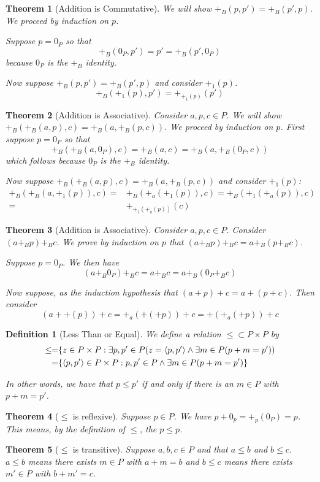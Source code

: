 \documentclass[12pt]{article}
\theoremstyle{break}
\newtheorem{definition}{Definition}[section]
\theoremstyle{break}
\newtheorem{theorem}{Theorem}[section]
\theoremstyle{break}
\theoremstyle{break}
\theoremstyle{break}
\newtheorem{informal definition}[definition]{Informal Definition}
\begin{document}
\begin{theorem}[Addition is Commutative]
We will show $+_B(p, p') = +_B(p', p)$.
We proceed by induction on $p$.

Suppose $p=0_P$ so that
$$
+_B(0_P, p') = p' = +_B(p', 0_P)
$$
because $0_P$ is the $+_B$ identity.

Now suppose $+_B(p, p') = +_B(p', p)$ and consider $+_1(p)$.
$$
+_B(+_1(p), p') = +_{+_1(p)}(p')
$$

\end{theorem}

\begin{theorem}[Addition is Associative]
Consider $a, p, c \in P$.
We will show $+_B(+_B(a, p), c) = +_B(a, +_B(p, c))$.
We proceed by induction on $p$.
First suppose $p=0_P$ so that
$$
+_B(+_B(a, 0_P), c) = +_B(a, c) = +_B(a, +_B(0_P, c))
$$
which follows because $0_P$ is the $+_B$ identity.

Now suppose $+_B(+_B(a, p), c) = +_B(a, +_B(p, c))$ and consider $+_1(p)$:
\begin{align*}
+_B(+_B(a, +_1(p)), c) =& +_B(+_a(+_1(p)), c) = +_B(+_1(+_a(p)), c)\\
=& +_{+_1(+_a(p))}(c)
\end{align*}
\end{theorem}


\begin{theorem}[Addition is Associative]
Consider $a, p, c\in P$.
Consider $(a+_B p) +_B c$.
We prove by induction on $p$ that $(a +_B p) +_B c = a +_B (p+_B c)$.

Suppose $p=0_P$.
We then have
$$
(a+_B 0_P) +_B c = a +_B c = a +_B (0_P +_B c)
$$

Now suppose, as the induction hypothesis that $(a + p) + c = a + (p+c)$.
Then consider
$$
(a + +(p)) + c = +_a(+(+p)) + c = +(+_a(+p)) + c
$$

\end{theorem}

\begin{definition}[Less Than or Equal]
We define a relation $\le\subset P \times P$ by
\begin{align*}
\le =& \{z \in P\times P: \exists p, p' \in P (z = \braket{p, p'} \land \exists m\in P(p+m = p'))\\
=& \{\braket{p, p'}\in P\times P: p, p' \in P \land \exists m\in P( p+m = p')\}
\end{align*}

In other words, we have that $p \le p'$ if and only if there is an $m\in P$ with $p+m = p'$.
\end{definition}

\begin{theorem}[$\le$ is reflexive]
Suppose $p\in P$.
We have $p+0_p = +_p(0_P) = p$.
This means, by the definition of $\le$, the $p\le p$.
\end{theorem}

\begin{theorem}[$\le$ is transitive]
Suppose $a, b, c \in P$ and that $a \le b$ and $b\le c$.
$a\le b$ means there exists $m\in P$ with $a+m = b$ and $b \le c$ means there exists $m' \in P$ with $b+m' = c$.
\end{theorem}
\end{document}
